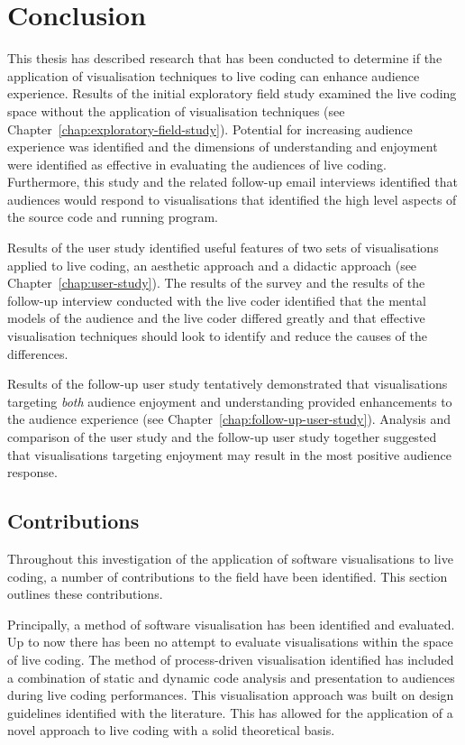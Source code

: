 
\chapter{Conclusion}
\label{chap:conclusion}

This thesis has described research that has been conducted to determine if the application of visualisation techniques to live coding can enhance audience experience. Results of the initial exploratory field study examined the live coding space without the application of visualisation techniques (see Chapter~\ref{chap:exploratory-field-study}). Potential for increasing audience experience was identified and the dimensions of understanding and enjoyment were identified as effective in evaluating the audiences of live coding. Furthermore, this study and the related follow-up email interviews identified that audiences would respond to visualisations that identified the high level aspects of the source code and running program.

Results of the user study identified useful features of two sets of visualisations applied to live coding, an aesthetic approach and a didactic approach (see Chapter~\ref{chap:user-study}). The results of the survey and the results of the follow-up interview conducted with the live coder identified that the mental models of the audience and the live coder differed greatly and that effective visualisation techniques should look to identify and reduce the causes of the differences.

Results of the follow-up user study tentatively demonstrated that visualisations targeting \textit{both} audience enjoyment and understanding provided enhancements to the audience experience (see Chapter~\ref{chap:follow-up-user-study}). Analysis and comparison of the user study and the follow-up user study together suggested that visualisations targeting enjoyment may result in the most positive audience response.

\section{Contributions}

Throughout this investigation of the application of software visualisations to live coding, a number of contributions to the field have been identified. This section outlines these contributions.

Principally, a method of software visualisation has been identified and evaluated. Up to now there has been no attempt to evaluate visualisations within the space of live coding. The method of process-driven visualisation identified has included a combination of static and dynamic code analysis and presentation to audiences during live coding performances. This visualisation approach was built on design guidelines identified with the literature. This has allowed for the application of a novel approach to live coding with a solid theoretical basis.

